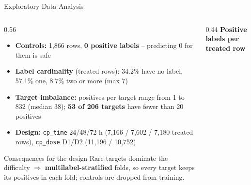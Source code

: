 \documentclass[9pt,aspectratio=169]{beamer}
\begin{document}
\begin{frame}{Exploratory Data Analysis}
  \begin{columns}[T]
    \begin{column}{0.56\textwidth}
      \begin{itemize}
        \item \textbf{Controls:} 1,866 rows, \textbf{0 positive labels} -- predicting 0 for them is safe
        \item \textbf{Label cardinality} (treated rows): 34.2\% have no label, 57.1\% one, 8.7\% two or more (max 7)
        \item \textbf{Target imbalance:} positives per target range from 1 to 832 (median 38); \textbf{53 of 206 targets} have fewer than 20 positives
        \item \textbf{Design:} \texttt{cp\_time} 24/48/72 h (7,166 / 7,602 / 7,180 treated rows), \texttt{cp\_dose} D1/D2 (11,196 / 10,752)
      \end{itemize}
      \begin{alertblock}{Consequences for the design}
        Rare targets dominate the difficulty $\Rightarrow$ \textbf{multilabel-stratified} folds, so every target keeps its positives in each fold; controls are dropped from training.
      \end{alertblock}
    \end{column}
    \begin{column}{0.44\textwidth}
      \centering
      {\small\textbf{Positive labels per treated row}}\\[2mm]
    \end{column}
  \end{columns}
\end{frame}
\end{document}

